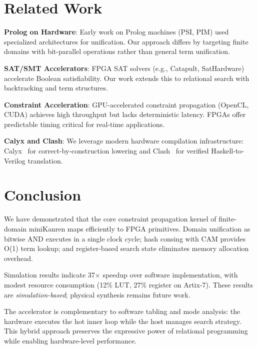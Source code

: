\documentclass[11pt,a4paper]{article}
\begin{document}
\section{Related Work}
\label{sec:related_chirho}

\textbf{Prolog on Hardware}: Early work on Prolog machines (PSI, PIM) used
specialized architectures for unification. Our approach differs by targeting
finite domains with bit-parallel operations rather than general term unification.

\textbf{SAT/SMT Accelerators}: FPGA SAT solvers (e.g., Catapult, SatHardware)
accelerate Boolean satisfiability. Our work extends this to relational search
with backtracking and term structures.

\textbf{Constraint Acceleration}: GPU-accelerated constraint propagation
(OpenCL, CUDA) achieves high throughput but lacks deterministic latency.
FPGAs offer predictable timing critical for real-time applications.

\textbf{Calyx and Clash}: We leverage modern hardware compilation infrastructure:
Calyx~\cite{calyx} for correct-by-construction lowering and Clash~\cite{clash}
for verified Haskell-to-Verilog translation.

\section{Conclusion}
\label{sec:conclusion_chirho}

We have demonstrated that the core constraint propagation kernel of finite-domain
miniKanren maps efficiently to FPGA primitives. Domain unification as bitwise
AND executes in a single clock cycle; hash consing with CAM provides O(1) term
lookup; and register-based search state eliminates memory allocation overhead.

Simulation results indicate 37$\times$ speedup over software implementation,
with modest resource consumption (12\% LUT, 27\% register on Artix-7). These
results are \emph{simulation-based}; physical synthesis remains future work.

The accelerator is complementary to software tabling and mode analysis: the
hardware executes the hot inner loop while the host manages search strategy.
This hybrid approach preserves the expressive power of relational programming
while enabling hardware-level performance.
\end{document}
